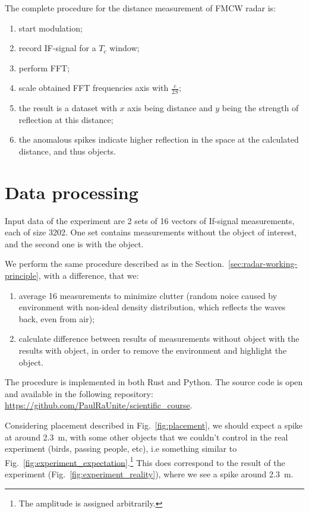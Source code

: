 \documentclass{article}
\begin{document}
The complete procedure for the distance measurement of FMCW radar is:
\begin{enumerate}
    \item start modulation;
    \item record IF-signal for a $T_c$ window;
    \item perform FFT;
    \item scale obtained FFT frequencies axis with $\frac{c}{2S}$;
    \item the result is a dataset with $x$ axis being distance and $y$ being the strength of reflection at this distance;
    \item the anomalous spikes indicate higher reflection in the space at the calculated distance, and thus objects.
\end{enumerate}

\section{Data processing}
\label{sec:data-post-processing}
Input data of the experiment are 2 sets of 16 vectors of If-signal measurements, each of size 3202.
One set contains measurements without the object of interest, and the second one is with the object.

We perform the same procedure described as in the Section.~\ref{sec:radar-working-principle}, with a difference, that we:
\begin{enumerate}
    \item average 16 measurements to minimize clutter (random noice caused by environment with non-ideal density distribution, which reflects the waves back, even from air);
    \item calculate difference between results of measurements without object with the results with object, in order to remove the environment and highlight the object.
\end{enumerate}

The procedure is implemented in both Rust and Python.
The source code is open and available in the following repository: \url{https://github.com/PaulRaUnite/scientific_course}.

Considering placement described in Fig.~\ref{fig:placement}, we should expect a spike at around \SI{2.3}{m}, with some other objects that we couldn't control in the real experiment (birds, passing people, etc), i.e something similar to Fig.~\ref{fig:experiment_expectation}.\footnote{The amplitude is assigned arbitrarily.}
This does correspond to the result of the experiment (Fig.~\ref{fig:experiment_reality}), where we see a spike around \SI{2.3}{m}.
\end{document}
